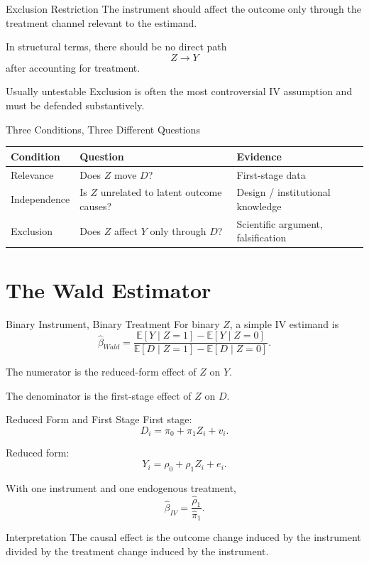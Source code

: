 \documentclass[aspectratio=169,11pt]{beamer}
\newcommand{\E}{\mathbb{E}}
\begin{document}
\begin{frame}{Exclusion Restriction}
The instrument should affect the outcome only through the treatment channel relevant to the estimand.

In structural terms, there should be no direct path
\[
Z\rightarrow Y
\]
after accounting for treatment.

\begin{alertblock}{Usually untestable}
Exclusion is often the most controversial IV assumption and must be defended substantively.
\end{alertblock}
\end{frame}

\begin{frame}{Three Conditions, Three Different Questions}
\begin{tabular}{p{3.1cm}p{4.2cm}p{5cm}}
\toprule
\textbf{Condition} & \textbf{Question} & \textbf{Evidence} \\
\midrule
Relevance & Does \(Z\) move \(D\)? & First-stage data \\
Independence & Is \(Z\) unrelated to latent outcome causes? & Design / institutional knowledge \\
Exclusion & Does \(Z\) affect \(Y\) only through \(D\)? & Scientific argument, falsification \\
\bottomrule
\end{tabular}
\end{frame}

\section{The Wald Estimator}

\begin{frame}{Binary Instrument, Binary Treatment}
For binary \(Z\), a simple IV estimand is
\[
\widehat{\beta}_{Wald}
=
\frac{
\E[Y\mid Z=1]-\E[Y\mid Z=0]
}{
\E[D\mid Z=1]-\E[D\mid Z=0]
}.
\]

The numerator is the reduced-form effect of \(Z\) on \(Y\).

The denominator is the first-stage effect of \(Z\) on \(D\).
\end{frame}

\begin{frame}{Reduced Form and First Stage}
First stage:
\[
D_i=\pi_0+\pi_1Z_i+v_i.
\]

Reduced form:
\[
Y_i=\rho_0+\rho_1Z_i+e_i.
\]

With one instrument and one endogenous treatment,
\[
\widehat{\beta}_{IV}
=
\frac{\widehat{\rho}_1}{\widehat{\pi}_1}.
\]

\begin{block}{Interpretation}
The causal effect is the outcome change induced by the instrument divided by the treatment change induced by the instrument.
\end{block}
\end{frame}
\end{document}
